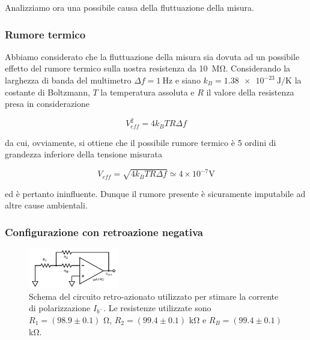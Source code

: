 Analizziamo ora una possibile causa della  fluttuazione della misura.

\subsubsection*{Rumore termico}

Abbiamo considerato che la fluttuazione della misura sia dovuta ad un possibile effetto del rumore termico sulla nostra resistenza da \SI{10}{\mega\ohm}. Considerando la larghezza di banda del multimetro $\Delta f = \SI{1}{\hertz}$ e siano $k_B = \SI{1.38e-23}{\joule\per\kelvin}$ la costante di Boltzmann, $T$ la temperatura assoluta e $R$ il valore della resistenza presa in considerazione

\begin{equation}
	V_{eff}^2 = 4 k_B T R \Delta f
\end{equation}

da cui, ovviamente, si ottiene che il possibile rumore termico è 5 ordini di grandezza inferiore della tensione misurata

\begin{equation}
	V_{eff} = \sqrt{4 k_B T R \Delta f} \simeq 4 \times 10^{-7} \si{\volt}
\end{equation}

ed è pertanto ininfluente. Dunque il rumore presente è sicuramente imputabile ad altre cause ambientali.

\subsubsection{Configurazione con retroazione negativa}

\begin{figure}
  \begin{center}
    \includegraphics[width=0.35\textwidth]{../E02/latex/inv_current.pdf}
  \end{center}
  \caption{Schema del circuito retro-azionato utilizzato per stimare la corrente di polarizzazione $I_{b^-}$. Le resistenze utilizzate sono $R_1=(98.9\pm0.1)$ \si{\ohm}, $R_2=(99.4\pm0.1)$ \si{\kilo\ohm} e $R_B=(99.4\pm0.1)$ \si{\kilo\ohm}.}
  \label{circuito:rel2_correnti_retroazione_inv}
\end{figure}

